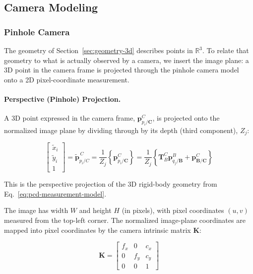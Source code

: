 \documentclass{article}
\newcommand{\vect}[1]{\mathbf{#1}}
\newcommand{\mat}[1]{\mathbf{#1}}
\newcommand{\TCB}{\mat{T}^C_{B}}
\newcommand{\pBjB}{\vect{p}^{\mathit{B}}_{q_{j}/\mathbf{B}}}
\newcommand{\pCiC}{\vect{p}^{\mathit{C}}_{p_{i}/\mathbf{C}}}
\newcommand{\pBCC}{\vect{p}^{\mathit{C}}_{\mathbf{B}/\mathbf{C}}}
\newcommand{\Kmat}{\mat{K}} %
\begin{document}
\newpage
\subsection{Camera Modeling}
\label{sec:camera-modeling}

\subsubsection{Pinhole Camera}
\label{sec:pinhole-camera}

The geometry of Section~\ref{sec:geometry-3d} describes points in $\mathbb{R}^3$. To relate that geometry to what is actually observed by a camera, we insert the image plane: a 3D point in the camera frame is projected through the pinhole camera model onto a 2D pixel-coordinate measurement.

\paragraph{Perspective (Pinhole) Projection.}
A 3D point expressed in the camera frame, $\pCiC$, is projected onto the normalized image plane by dividing through by its depth (third component), $Z_j$:

\begin{equation}
    \begin{bmatrix}
        \tilde{x}_i \\
        \tilde{y}_i \\
        1
    \end{bmatrix}
    = \tilde{\vect{p}}^{\,C}_{p_i/C}
    = \frac{1}{Z_j}\left\{ \pCiC \right\}
    = \frac{1}{Z_j}\left\{ \TCB \pBjB + \pBCC \right\}
    \label{eq:pinhole-projection}
\end{equation}

This is the perspective projection of the 3D rigid-body geometry from Eq.~\eqref{eq:pcd-measurement-model}.

The image has width $W$ and height $H$ (in pixels), with pixel coordinates $(u,v)$ measured from the top-left corner. The normalized image-plane coordinates are mapped into pixel coordinates by the camera intrinsic matrix $\Kmat$:

\begin{equation}
    \Kmat =
    \begin{bmatrix}
        f_x & 0 & c_x \\
        0 & f_y & c_y \\
        0 & 0 & 1
    \end{bmatrix}
\end{equation}
\end{document}
